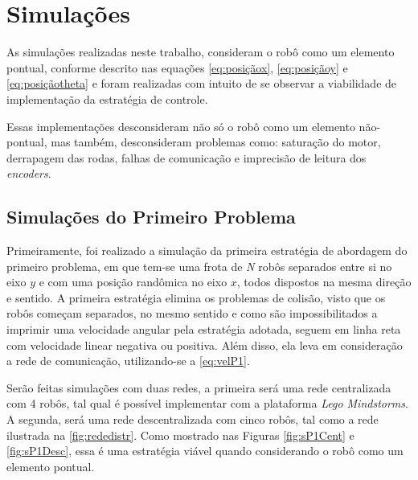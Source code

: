 \chapter{Simulações}
\label{chap:Simulacoes}

As simulações realizadas neste trabalho, consideram o robô como um elemento pontual, conforme descrito nas equações \ref{eq:posiçãox}, \ref{eq:posiçãoy} e \ref{eq:posiçãotheta} e foram realizadas com intuito de se observar a viabilidade de implementação da estratégia de controle. 

Essas implementações desconsideram não só o robô como um elemento não-pontual, mas também, desconsideram problemas como: saturação do motor, derrapagem das rodas, falhas de comunicação e imprecisão de leitura dos \emph{encoders}. 

\section{Simulações do Primeiro Problema}
\label{sec:SimulacaoP1}

Primeiramente, foi realizado a simulação da primeira estratégia de abordagem do primeiro problema, em que tem-se uma frota de \emph{N} robôs separados entre si no eixo $y$ e com uma posição randômica no eixo $x$, todos dispostos na mesma direção e sentido. A primeira estratégia elimina os problemas de colisão, visto que os robôs começam separados, no mesmo sentido e como são impossibilitados a imprimir uma velocidade angular pela estratégia adotada, seguem em linha reta com velocidade linear negativa ou positiva. Além disso, ela leva em consideração a rede de comunicação, utilizando-se a \autoref{eq:velP1}. 

Serão feitas simulações com duas redes, a primeira será uma rede centralizada com 4 robôs, tal qual é possível implementar com a plataforma \emph{Lego Mindstorms\textregistered}. A segunda, será uma rede descentralizada com cinco robôs, tal como a rede ilustrada na \autoref{fig:rededistr}. Como mostrado nas Figuras \ref{fig:sP1Cent} e \ref{fig:sP1Desc}, essa é uma estratégia viável quando considerando o robô como um elemento pontual.

